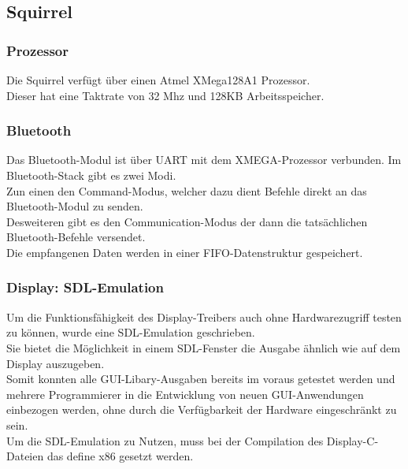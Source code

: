 \documentclass[12pt,a4paper]{article}
\begin{document}
	\subsection{Squirrel}
	\subsubsection{Prozessor}
	Die Squirrel verfügt über einen Atmel XMega128A1 Prozessor.\\
	Dieser hat eine Taktrate von 32 Mhz und 128KB Arbeitsspeicher.\\
	
	
	\subsubsection{Bluetooth}
	\label{bluetooth}
Das Bluetooth-Modul ist über UART mit dem XMEGA-Prozessor verbunden. Im Bluetooth-Stack gibt es zwei Modi. \\
Zun einen den Command-Modus, welcher dazu dient Befehle direkt an das Bluetooth-Modul zu senden.\\
Desweiteren gibt es den Communication-Modus der dann die tatsächlichen Bluetooth-Befehle versendet.\\
Die empfangenen Daten werden in einer FIFO-Datenstruktur gespeichert.\\


\subsubsection{Display: SDL-Emulation} %
Um die Funktionsfähigkeit des Display-Treibers auch ohne Hardwarezugriff testen zu können, wurde eine SDL-Emulation geschrieben.\\
Sie bietet die Möglichkeit in einem SDL-Fenster die Ausgabe ähnlich wie auf dem Display auszugeben.\\
Somit konnten alle GUI-Libary-Ausgaben bereits im voraus getestet werden und mehrere Programmierer in die Entwicklung von neuen GUI-Anwendungen einbezogen werden, ohne durch die Verfügbarkeit der Hardware eingeschränkt zu sein.\\
Um die SDL-Emulation zu Nutzen, muss bei der Compilation des Display-C-Dateien das define x86 gesetzt werden.\\
\end{document}
